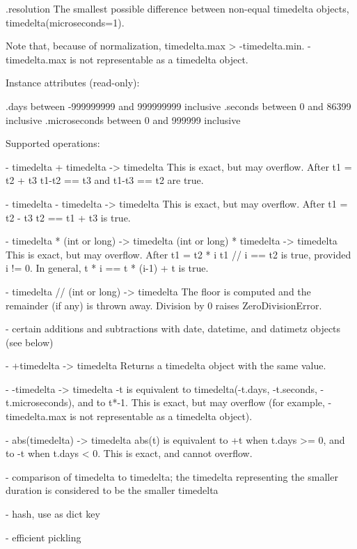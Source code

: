 {    .resolution
        The smallest possible difference between non-equal timedelta
        objects, timedelta(microseconds=1).

    Note that, because of normalization, timedelta.max > -timedelta.min.
    -timedelta.max is not representable as a timedelta object.

Instance attributes (read-only):

    .days           between -999999999 and 999999999 inclusive
    .seconds        between 0 and 86399 inclusive
    .microseconds   between 0 and 999999 inclusive

Supported operations:

    - timedelta + timedelta -> timedelta
      This is exact, but may overflow.  After
          t1 = t2 + t3
      t1-t2 == t3 and t1-t3 == t2 are true.

    - timedelta - timedelta -> timedelta
      This is exact, but may overflow.  After
          t1 = t2 - t3
       t2 == t1 + t3 is true.

    - timedelta * (int or long) -> timedelta
      (int or long) * timedelta -> timedelta
      This is exact, but may overflow.  After
          t1 = t2 * i
      t1 // i == t2 is true, provided i != 0.  In general,
          t * i == t * (i-1) + t
      is true.

    - timedelta // (int or long) -> timedelta
      The floor is computed and the remainder (if any) is thrown away.
      Division by 0 raises ZeroDivisionError.

    - certain additions and subtractions with date, datetime, and datimetz
      objects (see below)

    - +timedelta -> timedelta
      Returns a timedelta object with the same value.

    - -timedelta -> timedelta
      -t is equivalent to timedelta(-t.days, -t.seconds, -t.microseconds),
      and to t*-1.  This is exact, but may overflow (for example,
      -timedelta.max is not representable as a timedelta object).

    - abs(timedelta) -> timedelta
      abs(t) is equivalent to +t when t.days >= 0, and to -t when
      t.days < 0.  This is exact, and cannot overflow.

    - comparison of timedelta to timedelta; the timedelta representing
      the smaller duration is considered to be the smaller timedelta

    - hash, use as dict key

    - efficient pickling

}
